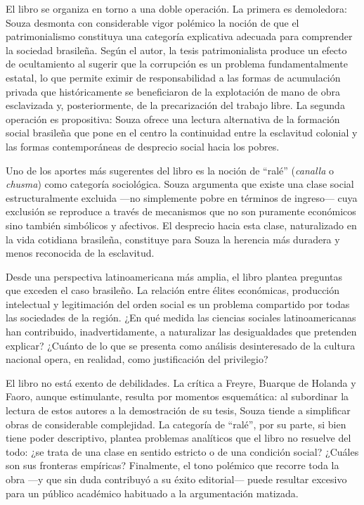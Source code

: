 \documentclass{article}
\begin{document}
El libro se organiza en torno a una doble operación. La primera es demoledora: Souza desmonta con considerable vigor polémico la noción de que el patrimonialismo constituya una categoría explicativa adecuada para comprender la sociedad brasileña. Según el autor, la tesis patrimonialista produce un efecto de ocultamiento al sugerir que la corrupción es un problema fundamentalmente estatal, lo que permite eximir de responsabilidad a las formas de acumulación privada que históricamente se beneficiaron de la explotación de mano de obra esclavizada y, posteriormente, de la precarización del trabajo libre. La segunda operación es propositiva: Souza ofrece una lectura alternativa de la formación social brasileña que pone en el centro la continuidad entre la esclavitud colonial y las formas contemporáneas de desprecio social hacia los pobres.

Uno de los aportes más sugerentes del libro es la noción de “ralé” (\textit{canalla} o \textit{chusma}) como categoría sociológica. Souza argumenta que existe una clase social estructuralmente excluida —no simplemente pobre en términos de ingreso— cuya exclusión se reproduce a través de mecanismos que no son puramente económicos sino también simbólicos y afectivos. El desprecio hacia esta clase, naturalizado en la vida cotidiana brasileña, constituye para Souza la herencia más duradera y menos reconocida de la esclavitud.

Desde una perspectiva latinoamericana más amplia, el libro plantea preguntas que exceden el caso brasileño. La relación entre élites económicas, producción intelectual y legitimación del orden social es un problema compartido por todas las sociedades de la región. ¿En qué medida las ciencias sociales latinoamericanas han contribuido, inadvertidamente, a naturalizar las desigualdades que pretenden explicar? ¿Cuánto de lo que se presenta como análisis desinteresado de la cultura nacional opera, en realidad, como justificación del privilegio?

El libro no está exento de debilidades. La crítica a Freyre, Buarque de Holanda y Faoro, aunque estimulante, resulta por momentos esquemática: al subordinar la lectura de estos autores a la demostración de su tesis, Souza tiende a simplificar obras de considerable complejidad. La categoría de “ralé”, por su parte, si bien tiene poder descriptivo, plantea problemas analíticos que el libro no resuelve del todo: ¿se trata de una clase en sentido estricto o de una condición social? ¿Cuáles son sus fronteras empíricas? Finalmente, el tono polémico que recorre toda la obra —y que sin duda contribuyó a su éxito editorial— puede resultar excesivo para un público académico habituado a la argumentación matizada.
\end{document}
